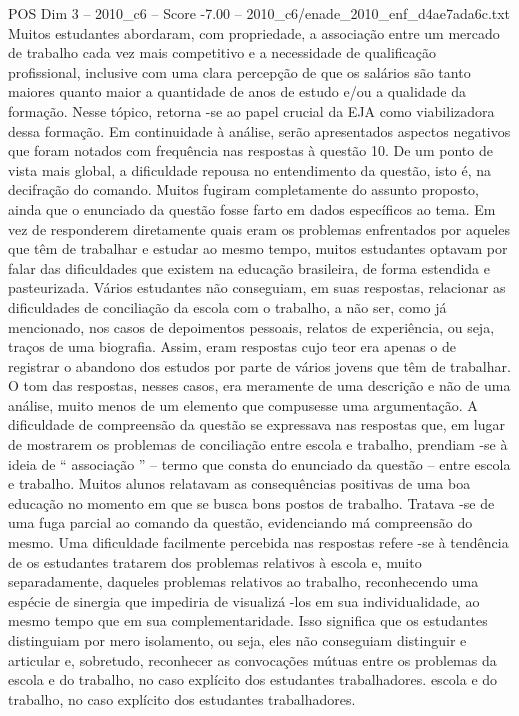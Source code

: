 \begin{textsample}{POS Dim 3 – 2010\_c6 – Score -7.00 – 2010\_c6/enade\_2010\_enf\_d4ae7ada6c.txt}
Muitos estudantes abordaram, com propriedade, a associação entre um mercado de trabalho cada vez mais competitivo e a necessidade de qualificação profissional, inclusive com uma clara percepção de que os salários são tanto maiores quanto maior a quantidade de anos de estudo e/ou a qualidade da formação.
Nesse tópico, retorna -se ao papel crucial da EJA como viabilizadora dessa formação.
Em continuidade à análise, serão apresentados aspectos negativos que foram notados com frequência nas respostas à questão 10.
De um ponto de vista mais global, a dificuldade repousa no entendimento da questão, isto é, na decifração do comando.
Muitos fugiram completamente do assunto proposto, ainda que o enunciado da questão fosse farto em dados específicos ao tema.
Em vez de responderem diretamente quais eram os problemas enfrentados por aqueles que têm de trabalhar e estudar ao mesmo tempo, muitos estudantes optavam por falar das dificuldades que existem na educação brasileira, de forma estendida e pasteurizada.
Vários estudantes não conseguiam, em suas respostas, relacionar as dificuldades de conciliação da escola com o trabalho, a não ser, como já mencionado, nos casos de depoimentos pessoais, relatos de experiência, ou seja, traços de uma biografia.
Assim, eram respostas cujo teor era apenas o de registrar o abandono dos estudos por parte de vários jovens que têm de trabalhar.
O tom das respostas, nesses casos, era meramente de uma descrição e não de uma análise, muito menos de um elemento que compusesse uma argumentação.
A dificuldade de compreensão da questão se expressava nas respostas que, em lugar de mostrarem os problemas de conciliação entre escola e trabalho, prendiam -se à ideia de “ associação ” – termo que consta do enunciado da questão – entre escola e trabalho.
Muitos alunos relatavam as consequências positivas de uma boa educação no momento em que se busca bons postos de trabalho.
Tratava -se de uma fuga parcial ao comando da questão, evidenciando má compreensão do mesmo.
Uma dificuldade facilmente percebida nas respostas refere -se à tendência de os estudantes tratarem dos problemas relativos à escola e, muito separadamente, daqueles problemas relativos ao trabalho, reconhecendo uma espécie de sinergia que impediria de visualizá -los em sua individualidade, ao mesmo tempo que em sua complementaridade.
Isso significa que os estudantes distinguiam por mero isolamento, ou seja, eles não conseguiam distinguir e articular e, sobretudo, reconhecer as convocações mútuas entre os problemas da escola e do trabalho, no caso explícito dos estudantes trabalhadores. escola e do trabalho, no caso explícito dos estudantes trabalhadores.

\end{textsample}
